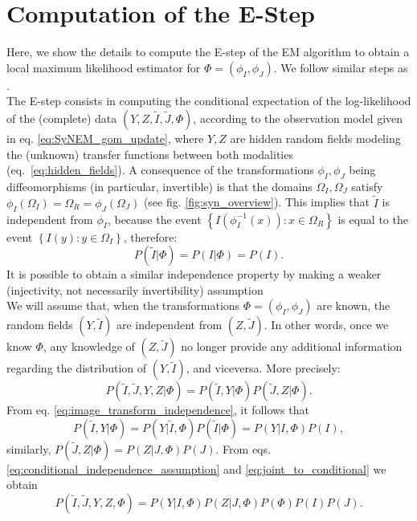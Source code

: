 \section{Computation of the E-Step}\label{ap:E_step}
Here, we show the details to compute the E-step of the EM algorithm \citep{Dempster1977} to obtain a local maximum likelihood estimator for $\Phi = (\phi_{I}, \phi_{J})$.
We follow similar steps as \cite{Arce-santana2014}.\\

The E-step \citep{Dempster1977} consists in computing the conditional expectation of the log-likelihood of the (complete) data $(Y, Z, \tilde{I}, \tilde{J}, \Phi)$, according to the observation model given in eq. \eqref{eq:SyNEM_gom_update}, where $Y, Z$ are hidden random fields modeling the (unknown) transfer functions between both modalities \hbox{(eq. \eqref{eq:hidden_fields})}. A consequence of the transformations $\phi_{I}, \phi_{J}$ being diffeomorphisms (in particular, invertible) is that the domains $\Omega_{I}, \Omega_{J}$ satisfy \hbox{$\phi_{I}(\Omega_{I}) = \Omega_{R} = \phi_{J}(\Omega_{J})$} (see fig. \ref{fig:syn_overview}). This implies that $\tilde{I}$ is independent from $\phi_{I}$, because the event $\left\lbrace I(\phi_{I}^{-1}(x)) : x\in \Omega_{R} \right\rbrace$ is equal to the event $\left\lbrace I(y) : y\in \Omega_{I} \right\rbrace$, therefore:
\begin{equation}\label{eq:image_transform_independence}
     P(\tilde{I} | \Phi) = P(I | \Phi) = P(I).
\end{equation}
It is possible to obtain a similar independence property by making a weaker (injectivity, not necessarily invertibility) assumption \citep[see][pg. 73]{Roche2000}\\

We will assume that, when the transformations $\Phi=(\phi_{I}, \phi_{J})$ are known, the random fields $(Y, \tilde{I})$ are independent from $(Z, \tilde{J})$. In other words, once we know $\Phi$, any knowledge of $(Z, \tilde{J})$ no longer provide any additional information regarding the distribution of $(Y, \tilde{I})$, and viceversa. More precisely:
\begin{equation}\label{eq:conditional_independence_assumption}
    P(\tilde{I}, \tilde{J}, Y, Z | \Phi) = P(\tilde{I}, Y | \Phi)P(\tilde{J}, Z| \Phi).
\end{equation}
From eq. \eqref{eq:image_transform_independence}, it follows that
\begin{equation}\label{eq:joint_to_conditional}
    P(\tilde{I}, Y | \Phi) = P(Y | \tilde{I}, \Phi)P(\tilde{I} | \Phi) = P(Y | I, \Phi)P(I),
\end{equation}
similarly, $P(\tilde{J}, Z| \Phi) = P(Z| J, \Phi)P(J)$. From eqs. \eqref{eq:conditional_independence_assumption} and \eqref{eq:joint_to_conditional} we obtain
\begin{equation}\label{eq:simplified_joint_prob}
    P(\tilde{I}, \tilde{J}, Y, Z, \Phi) = P(Y | I, \Phi)P(Z| J, \Phi)P(\Phi)P(I)P(J).
\end{equation}

